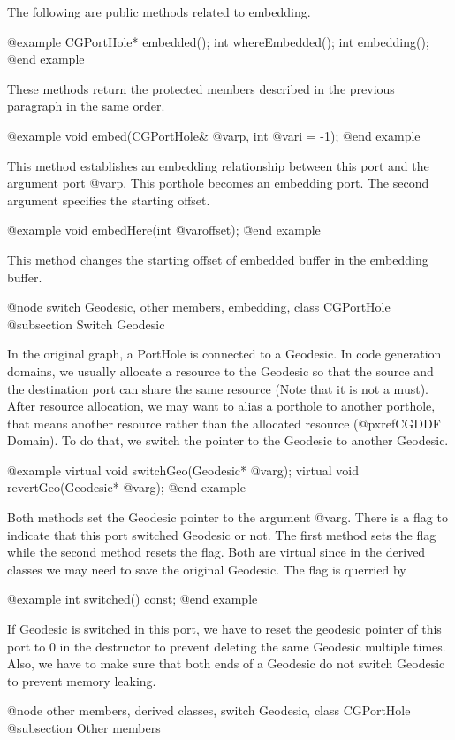 The following are public methods related to embedding.

@example
CGPortHole* embedded();
int whereEmbedded();
int embedding();
@end example

These methods return the protected members described in the previous
paragraph in the same order.

@example
void embed(CGPortHole& @var{p}, int @var{i} = -1);
@end example

This method establishes an embedding relationship between this port and
the argument port @var{p}. This porthole becomes an embedding port.
The second argument specifies the starting offset.

@example
void embedHere(int @var{offset});
@end example

This method changes the starting offset of embedded buffer in the embedding
buffer.

@node switch Geodesic, other members, embedding, class CGPortHole
@subsection Switch Geodesic

In the original graph, a PortHole is connected to a Geodesic. In code
generation domains, we usually allocate a resource to the Geodesic so that
the source and the destination port can share the same resource (Note that
it is not a must). After resource allocation, we may want to alias
a porthole to another porthole, that means another resource rather than
the allocated resource (@pxref{CGDDF Domain}). To do that, we switch
the pointer to the Geodesic to another Geodesic.

@example
virtual void switchGeo(Geodesic* @var{g});
virtual void revertGeo(Geodesic* @var{g});
@end example

Both methods set the Geodesic pointer to the argument @var{g}. There is a flag
to indicate that this port switched Geodesic or not. The first method
sets the flag while the second method resets the flag. Both are virtual since
in the derived classes we may need to save the original Geodesic.
The flag is querried by

@example
int switched() const;
@end example

If Geodesic is switched in this port, we have to reset the geodesic
pointer of this port to 0 in the destructor to prevent deleting the
same Geodesic multiple times. Also, we have to make sure that
both ends of a Geodesic do not switch Geodesic to prevent memory leaking.

@node other members, derived classes, switch Geodesic, class CGPortHole
@subsection Other members

